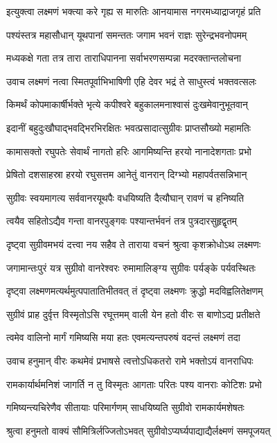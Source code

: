 \twolineshloka
{इत्युक्त्वा लक्ष्मणं भक्त्या करे गृह्य स मारुतिः}
{आनयामास नगरमध्याद्राजगृहं प्रति} %

\twolineshloka
{पश्यंस्तत्र महासौधान् यूथपानां समन्ततः}
{जगाम भवनं राज्ञः सुरेन्द्रभवनोपमम्} %

\twolineshloka
{मध्यकक्षे गता तत्र तारा ताराधिपानना}
{सर्वाभरणसम्पन्ना मदरक्तान्तलोचना} %

\twolineshloka
{उवाच लक्ष्मणं नत्वा स्मितपूर्वाभिभाषिणी}
{एहि देवर भद्रं ते साधुस्त्वं भक्तवत्सलः} %

\twolineshloka
{किमर्थं कोपमाकार्षीर्भक्ते भृत्ये कपीश्वरे}
{बहुकालमनाश्वासं दुःखमेवानुभूतवान्} %

\twolineshloka
{इदानीं बहुदुःखौघाद्भवद्भिरभिरक्षितः}
{भवत्प्रसादात्सुग्रीवः प्राप्तसौख्यो महामतिः} %

\twolineshloka
{कामासक्तो रघुपतेः सेवार्थं नागतो हरिः}
{आगमिष्यन्ति हरयो नानादेशगताः प्रभो} %

\twolineshloka
{प्रेषितो दशसाहस्रा हरयो रघुसत्तम}
{आनेतुं वानरान् दिग्भ्यो महापर्वतसन्निभान्} %

\twolineshloka
{सुग्रीवः स्वयमागत्य सर्ववानरयूथपैः}
{वधयिष्यति दैत्यौघान् रावणं च हनिष्यति} %

\twolineshloka
{त्वयैव सहितोऽद्यैव गन्ता वानरपुङ्गवः}
{पश्यान्तर्भवनं तत्र पुत्रदारसुहृद्वृतम्} %

\twolineshloka
{दृष्ट्वा सुग्रीवमभयं दत्त्वा नय सहैव ते}
{ताराया वचनं श्रुत्वा कृशक्रोधोऽथ लक्ष्मणः} %

\twolineshloka
{जगामान्तःपुरं यत्र सुग्रीवो वानरेश्वरः}
{रुमामालिङ्ग्य सुग्रीवः पर्यङ्के पर्यवस्थितः} %

\twolineshloka
{दृष्ट्वा लक्ष्मणमत्यर्थमुत्पपातातिभीतवत्}
{तं दृष्ट्वा लक्ष्मणः क्रुद्धो मदविह्वलितेक्षणम्} %

\twolineshloka
{सुग्रीवं प्राह दुर्वृत्त विस्मृतोऽसि रघूत्तमम्}
{वाली येन हतो वीरः स बाणोऽद्य प्रतीक्षते} %

\twolineshloka
{त्वमेव वालिनो मार्गं गमिष्यसि मया हतः}
{एवमत्यन्तपरुषं वदन्तं लक्ष्मणं तदा} %

\twolineshloka
{उवाच हनुमान् वीरः कथमेवं प्रभाषसे}
{त्वत्तोऽधिकतरो रामे भक्तोऽयं वानराधिपः} %

\twolineshloka
{रामकार्यार्थमनिशं जागर्ति न तु विस्मृतः}
{आगताः परितः पश्य वानराः कोटिशः प्रभो} %

\twolineshloka
{गमिष्यन्त्यचिरेणैव सीतायाः परिमार्गणम्}
{साधयिष्यति सुग्रीवो रामकार्यमशेषतः} %

\twolineshloka
{श्रुत्वा हनुमतो वाक्यं सौमित्रिर्लज्जितोऽभवत्}
{सुग्रीवोऽप्यर्घ्यपाद्याद्यैर्लक्ष्मणं समपूजयत्} %

